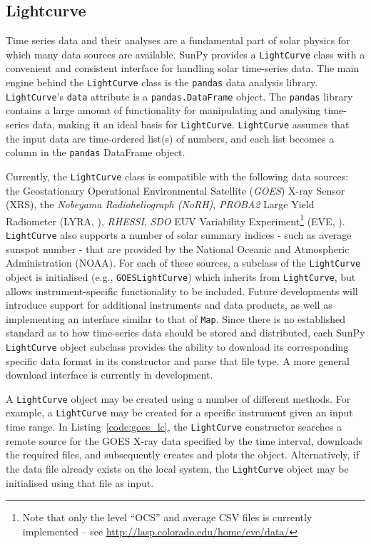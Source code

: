 \subsection{Lightcurve}\label{ssec:lightcurve}

Time series data and their analyses are a fundamental part of solar
physics for which many data sources are available.
SunPy provides a \texttt{LightCurve} class
with a convenient and consistent interface for handling solar time-series
data.  The main engine behind the \texttt{LightCurve} class is
the {\texttt{pandas}} data analysis library.  
\texttt{LightCurve}'s \texttt{data} attribute is a \texttt{pandas.DataFrame} 
object. The \texttt{pandas} library contains a large amount
of functionality for manipulating and analysing time-series data,
making it an ideal basis for \texttt{LightCurve}.  \texttt{LightCurve}
assumes that the input data are time-ordered list(s) of numbers, and each
list becomes a column in the \texttt{pandas} DataFrame object.

Currently, the \texttt{LightCurve} class is compatible with the
following data sources: the Geostationary Operational Environmental
Satellite (\textit{GOES}) X-ray Sensor (XRS), the \textit{Nobeyama
  Radioheliograph (NoRH)}, \textit{PROBA2} Large Yield Radiometer
(LYRA, \citealt{2013SoPh..286...21D}), \textit{RHESSI},
\textit{SDO} EUV Variability Experiment\footnote{Note that only the level ``OCS'' and average
  CSV files is currently implemented -- see
  \url{http://lasp.colorado.edu/home/eve/data/}} (EVE, \citealt{2012SoPh..275..115W}). 
\texttt{LightCurve}
also supports a number of solar summary indices - such as average
sunspot number - that are provided by the National Oceanic and
Atmospheric Administration (NOAA).  For each of these sources, a
subclass of the \texttt{LightCurve} object is initialised (e.g.,
\texttt{GOESLightCurve}) which inherits from \texttt{LightCurve}, but
allows instrument-specific functionality to be included.  Future
developments will introduce support for additional instruments and
data products, as well as implementing an interface similar to that of
\texttt{Map}.  Since there is no established standard as to how
time-series data should be stored and distributed, each SunPy
\texttt{LightCurve} object subclass provides the ability to download
its corresponding specific data format in its constructor and parse
that file type. A more general download interface is currently in development.

A \texttt{LightCurve} object may be created using a number of different methods. 
For example, a \texttt{LightCurve} may be created for a specific instrument given
an input time range. In Listing~\ref{code:goes_lc}, 
the \texttt{LightCurve} constructor searches a remote source for the GOES X-ray 
data specified by the time interval, downloads the required files, and 
subsequently creates and plots the object. Alternatively, if the data file 
already exists on the local system, the \texttt{LightCurve} object may be 
initialised using that file as input.

